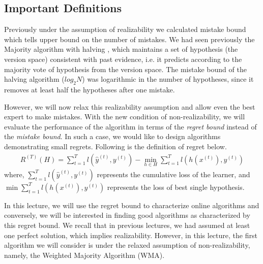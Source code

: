 \documentclass[11pt]{article}
\DeclareMathOperator*{\minimize}{min}
\begin{document}
\subsection{Important Definitions}


\normalfont
Previously under the assumption of realizability we calculated mistake bound which tells upper bound on the number of mistakes. We had seen previously the Majority algorithm with halving , which maintains a set of hypothesis (the version space) consistent with past evidence, i.e. it predicts according to the majority vote of hypothesis from the version space. The mistake bound of the halving algorithm ($log_{2}N$) was logarithmic in the number of hypotheses, since it removes at least half the hypotheses after one mistake. 

However, we will now relax this realizability assumption and allow even the best expert to make mistakes. With the new condition of non-realizability, we will evaluate the performance of the algorithm in terms of the \textit{regret bound} instead of the \textit{mistake bound}. In such a case, we would like to design algorithms demonstrating small regrets. Following is the definition of regret below.
\begin{align}
    R^{(T)}(H)=\sum_{t=1}^{T} l(\hat{y}^{(t)}, y^{(t)}) - \minimize_{h\in H}  \sum_{t=1}^{T} l(h(x^{(t)}), y^{(t)})\label{def:regret}
\end{align}
\normalfont
where, $\sum_{t=1}^{T} l(\hat{y}^{(t)}, y^{(t)})$ represents the cumulative loss of the learner, and $\minimize\sum_{t=1}^{T} l(h(x^{(t)}), y^{(t)})$ represents the loss of best single hypothesis. 

In this lecture, we will use the regret bound to characterize online algorithms and conversely, we will be interested in finding good algorithms as characterized by this regret bound. We recall that in previous lectures, we had assumed at least one perfect solution, which implies realizability. However, in this lecture, the first algorithm we will consider is under the relaxed assumption of non-realizability, namely, the Weighted Majority Algorithm (WMA).

\end{document}
